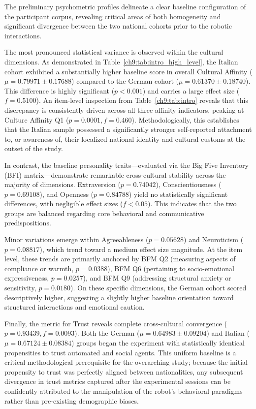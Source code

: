 The preliminary psychometric profiles delineate a clear baseline configuration of the participant corpus, revealing critical areas of both homogeneity and significant divergence between the two national cohorts prior to the robotic interactions. 

The most pronounced statistical variance is observed within the cultural dimensions. 
As demonstrated in Table~\ref{ch9:tab:intro_high_level}, the Italian cohort exhibited a substantially higher baseline score in overall Cultural Affinity ($\mu = 0.79971 \pm 0.17688$) compared to the German cohort ($\mu = 0.61370 \pm 0.18740$).
This difference is highly significant ($p < 0.001$) and carries a large effect size ($f = 0.5100$). 
An item-level inspection from Table~\ref{ch9:tab:intro} reveals that this discrepancy is consistently driven across all three affinity indicators, peaking at Culture Affinity Q1 ($p = 0.0001, f = 0.460$). 
Methodologically, this establishes that the Italian sample possessed a significantly stronger self-reported attachment to, or awareness of, their localized national identity and cultural customs at the outset of the study. 

In contrast, the baseline personality traits—evaluated via the Big Five Inventory (BFI) matrix—demonstrate remarkable cross-cultural stability across the majority of dimensions. 
Extraversion ($p = 0.74042$), Conscientiousness ($p = 0.69108$), and Openness ($p = 0.84788$) yield no statistically significant differences, with negligible effect sizes ($f < 0.05$). 
This indicates that the two groups are balanced regarding core behavioral and communicative predispositions. 

Minor variations emerge within Agreeableness ($p = 0.05628$) and Neuroticism ($p = 0.08817$), which trend toward a medium effect size magnitude. 
At the item level, these trends are primarily anchored by BFM Q2 (measuring aspects of compliance or warmth, $p = 0.0388$), BFM Q6 (pertaining to socio-emotional expressiveness, $p = 0.0257$), and BFM Q9 (addressing structural anxiety or sensitivity, $p = 0.0180$). 
On these specific dimensions, the German cohort scored descriptively higher, suggesting a slightly higher baseline orientation toward structured interactions and emotional caution.

Finally, the metric for Trust reveals complete cross-cultural convergence ($p = 0.93439, f = 0.0093$). 
Both the German ($\mu = 0.64983 \pm 0.09204$) and Italian ($\mu = 0.67124 \pm 0.08384$) groups began the experiment with statistically identical propensities to trust automated and social agents. 
This uniform baseline is a critical methodological prerequisite for the overarching study; because the initial propensity to trust was perfectly aligned between nationalities, any subsequent divergence in trust metrics captured after the experimental sessions can be confidently attributed to the manipulation of the robot's behavioral paradigms rather than pre-existing demographic biases.
